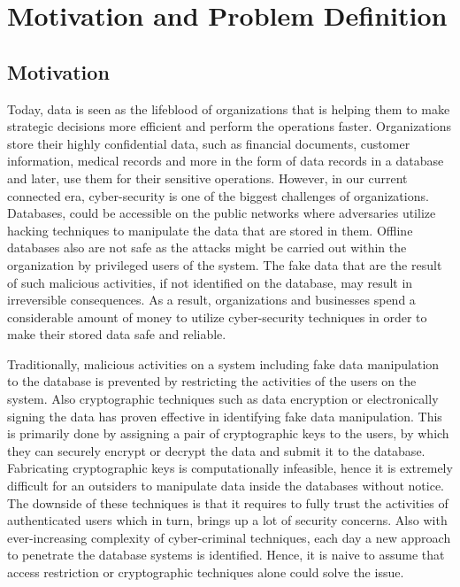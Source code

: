 \chapter{Motivation and Problem Definition}
\label{chap:introduction}

\section{Motivation}
Today, data is seen as the lifeblood of organizations that is helping them to make strategic decisions more efficient and perform the operations faster. Organizations store their highly confidential data, such as financial documents, customer information, medical records and more in the form of data records in a database and later, use them for their sensitive operations. However, in our current connected era, cyber-security is one of the biggest challenges of organizations. Databases, could be accessible on the public networks where adversaries utilize hacking techniques to manipulate the data that are stored in them. Offline databases also are not safe as the attacks might be carried out within the organization by privileged users of the system. The fake data that are the result of such malicious activities, if not identified on the database, may result in irreversible consequences. As a result, organizations and businesses spend a considerable amount of money to utilize cyber-security techniques in order to make their stored data safe and reliable. 

Traditionally, malicious activities on a system including fake data manipulation to the database is prevented by restricting the activities of the users on the system. Also cryptographic techniques such as data encryption or electronically signing the data has proven effective in identifying fake data manipulation. This is primarily done by assigning a pair of cryptographic keys to the users, by which they can securely encrypt or decrypt the data and submit it to the database. Fabricating cryptographic keys is computationally infeasible, hence it is extremely difficult for an outsiders to manipulate data inside the databases without notice. The downside of these techniques is that it requires to fully trust the activities of authenticated users which in turn, brings up a lot of security concerns. Also with ever-increasing complexity of cyber-criminal techniques, each day a new approach to penetrate the database systems is identified. Hence, it is naive to assume that access restriction or cryptographic techniques alone could solve the issue. 

